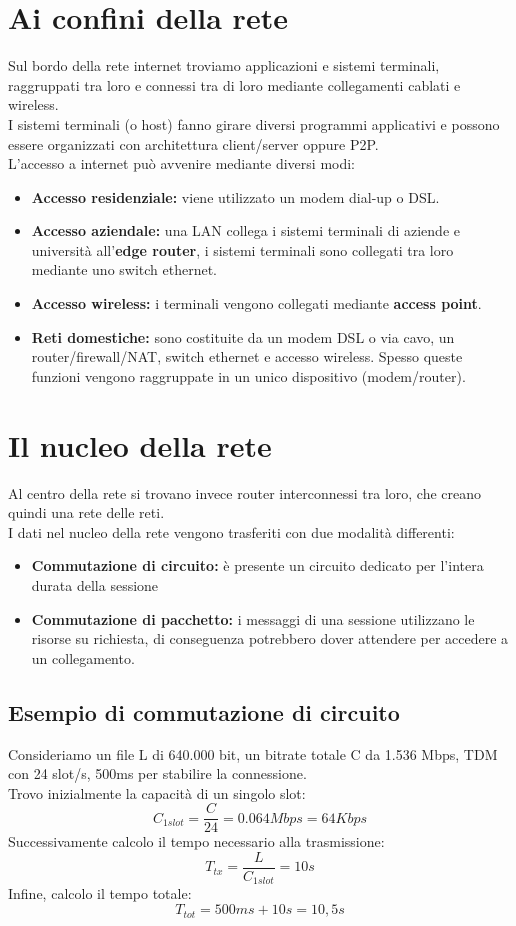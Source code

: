 \documentclass{report}
\begin{document}
	\section{Ai confini della rete}
	Sul bordo della rete internet troviamo applicazioni e sistemi terminali, raggruppati tra loro e connessi tra di loro mediante collegamenti cablati e wireless.
	\medskip\\I sistemi terminali (o host) fanno girare diversi programmi applicativi e possono essere organizzati con architettura client/server oppure P2P.
	\medskip\\L'accesso a internet può avvenire mediante diversi modi:
	\begin{itemize}
		\item \textbf{Accesso residenziale:} viene utilizzato un modem dial-up o DSL.
		\item \textbf{Accesso aziendale:} una LAN collega i sistemi terminali di aziende e università all'\textbf{edge router}, i sistemi terminali sono collegati tra loro mediante uno switch ethernet.
		\item \textbf{Accesso wireless:} i terminali vengono collegati mediante \textbf{access point}.
		\item \textbf{Reti domestiche:} sono costituite da un modem DSL o via cavo, un router/firewall/NAT, switch ethernet e accesso wireless. Spesso queste funzioni vengono raggruppate in un unico dispositivo (modem/router).
	\end{itemize}
	\section{Il nucleo della rete}
	Al centro della rete si trovano invece router interconnessi tra loro, che creano quindi una rete delle reti.
	\medskip\\I dati nel nucleo della rete vengono trasferiti con due modalità differenti:
	\begin{itemize}
		\item \textbf{Commutazione di circuito:} è presente un circuito dedicato per l'intera durata della sessione
		\item \textbf{Commutazione di pacchetto:} i messaggi di una sessione utilizzano le risorse su richiesta, di conseguenza potrebbero dover attendere per accedere a un collegamento.
	\end{itemize}
	\subsection{Esempio di commutazione di circuito}
	Consideriamo un file L di 640.000 bit, un bitrate totale C da 1.536 Mbps, TDM con 24 slot/s, 500ms per stabilire la connessione.
	\medskip\\ Trovo inizialmente la capacità di un singolo slot:\[C_{1 slot} = \frac{C}{24} = 0.064 Mbps = 64 Kbps\]
	Successivamente calcolo il tempo necessario alla trasmissione:\[T_{tx} = \frac{L}{C_{1 slot}} = 10s\]
	Infine, calcolo il tempo totale:\[T_{tot}=500ms+10s=10,5s\]
\end{document}
